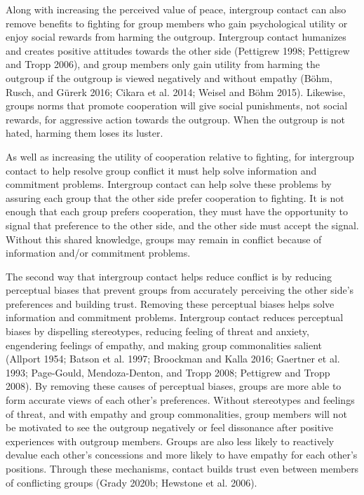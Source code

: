 \documentclass[11pt]{article}
\begin{document}
Along with increasing the perceived value of peace, intergroup contact
can also remove benefits to fighting for group members who gain
psychological utility or enjoy social rewards from harming the outgroup.
Intergroup contact humanizes and creates positive attitudes towards the
other side (Pettigrew 1998; Pettigrew and Tropp 2006), and group members
only gain utility from harming the outgroup if the outgroup is viewed
negatively and without empathy (Böhm, Rusch, and Gürerk 2016; Cikara et
al. 2014; Weisel and Böhm 2015). Likewise, groups norms that promote
cooperation will give social punishments, not social rewards, for
aggressive action towards the outgroup. When the outgroup is not hated,
harming them loses its luster.

As well as increasing the utility of cooperation relative to fighting,
for intergroup contact to help resolve group conflict it must help solve
information and commitment problems. Intergroup contact can help solve
these problems by assuring each group that the other side prefer
cooperation to fighting. It is not enough that each group prefers
cooperation, they must have the opportunity to signal that preference to
the other side, and the other side must accept the signal. Without this
shared knowledge, groups may remain in conflict because of information
and/or commitment problems.

The second way that intergroup contact helps reduce conflict is by
reducing perceptual biases that prevent groups from accurately
perceiving the other side's preferences and building trust. Removing
these perceptual biases helps solve information and commitment problems.
Intergroup contact reduces perceptual biases by dispelling stereotypes,
reducing feeling of threat and anxiety, engendering feelings of empathy,
and making group commonalities salient (Allport 1954; Batson et al.
1997; Broockman and Kalla 2016; Gaertner et al. 1993; Page-Gould,
Mendoza-Denton, and Tropp 2008; Pettigrew and Tropp 2008). By removing
these causes of perceptual biases, groups are more able to form accurate
views of each other's preferences. Without stereotypes and feelings of
threat, and with empathy and group commonalities, group members will not
be motivated to see the outgroup negatively or feel dissonance after
positive experiences with outgroup members. Groups are also less likely
to reactively devalue each other's concessions and more likely to have
empathy for each other's positions. Through these mechanisms, contact
builds trust even between members of conflicting groups (Grady 2020b;
Hewstone et al. 2006).
\end{document}
